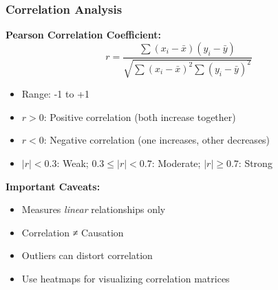 \documentclass[aspectratio=169]{beamer}
\begin{document}
\begin{frame}
\frametitle{Correlation Analysis}

\textbf{Pearson Correlation Coefficient:}
\begin{equation*}
r = \frac{\sum (x_i - \bar{x})(y_i - \bar{y})}{\sqrt{\sum (x_i - \bar{x})^2 \sum (y_i - \bar{y})^2}}
\end{equation*}

\begin{itemize}
    \item Range: -1 to +1
    \item $r > 0$: Positive correlation (both increase together)
    \item $r < 0$: Negative correlation (one increases, other decreases)
    \item $|r| < 0.3$: Weak; $0.3 \leq |r| < 0.7$: Moderate; $|r| \geq 0.7$: Strong
\end{itemize}

\vspace{0.5cm}

\textbf{Important Caveats:}
\begin{itemize}
    \item Measures \textit{linear} relationships only
    \item Correlation ≠ Causation
    \item Outliers can distort correlation
    \item Use heatmaps for visualizing correlation matrices
\end{itemize}

\end{frame}
\end{document}
